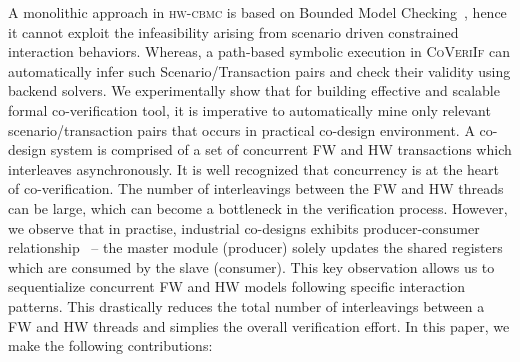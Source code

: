 \documentclass[sigconf]{acmart}
\newcommand{\tool}[1]{\textsc{#1}\xspace}
\newcommand{\hwcbmcv}{\tool{hw-cbmc}}
\newcommand{\verifox}{\tool{CoVeriIf}}
\begin{document}
A monolithic approach in \hwcbmcv is based on Bounded Model Checking~\cite{CKY03}, 
hence it cannot exploit the infeasibility arising from scenario driven constrained 
interaction behaviors.  Whereas, a path-based symbolic execution in 
\verifox can automatically infer such Scenario/Transaction pairs and check their 
validity using backend solvers.  We experimentally show that for building 
effective and scalable formal co-verification tool, it is imperative to 
automatically mine only relevant scenario/transaction pairs that occurs in 
practical co-design environment. 
%
A co-design system is comprised of a set of concurrent FW and HW transactions 
which interleaves asynchronously. It is well recognized that concurrency is at
the heart of co-verification. The number of interleavings between the FW
and HW threads can be large, which can become a bottleneck in the
verification process.  
However, we observe that in practise, industrial co-designs exhibits 
producer-consumer
relationship~\cite{polig2014micro,polig2014fpl,giefers2015accelerating} --
the master module (producer) solely updates the shared registers which are
consumed by the slave (consumer).  This key observation allows us to
sequentialize concurrent FW and HW models following specific interaction
patterns.  This drastically reduces the total number of interleavings 
between a FW and HW threads and simplies the overall verification effort. 
%
In this paper, we make the following contributions:
\end{document}
